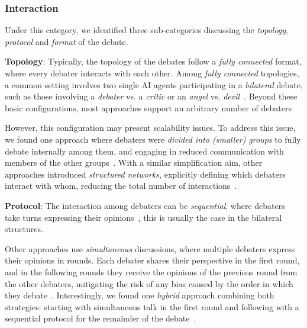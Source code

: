 \documentclass[conference]{IEEEtran}
\begin{document}
\subsubsection{Interaction}
Under this category, we identified three sub-categories discussing the \textit{topology}, \textit{protocol} and \textit{format} of the debate.

\textbf{Topology}: 
Typically, the topology of the debates follow a \textit{fully connected} format, where every debater interacts with each other. Among\textit{ fully connected} topologies, a common setting involves two single AI agents participating in a \textit{bilateral} debate, such as those involving a \textit{debater} vs. a \textit{critic} or an \textit{angel} vs. \textit{devil}~\cite{p02-fang-2025,p04-liang-2024,p09-lim-2024, p26-li-2024}. %
Beyond these basic configurations, most approaches support an arbitrary number of debaters~\cite{p11-Huang-2024,p16-Bai-2024,p17-wang-2025,p20-Jeptoo-2025,p21-wang-2024,p28-chan-2024,s05-wang-2024,s09-yang-2024,s11-Yu-He-2024,s12-xiong-2023,s14-pham-2024,s17-du-2024, s23-chen-2024,s28-xu-2023}

However, this configuration may present scalability issues. To address this issue, we found one approach where debaters were \textit{divided into (smaller) groups} to fully debate internally among them, and engaging in reduced communication with members of the other groups~\cite{s24-wang-2024}.
With a similar simplification aim, other approaches introduced \textit{structured networks}, explicitly defining which debaters interact with whom, reducing the total number of interactions~\cite{p03-li-2024,s18-chen-2025, s29-wang-2024}. 



\textbf{Protocol}: The interaction among debaters can be \textit{sequential}, where debaters take turns expressing their opinions~\cite{p02-fang-2025,p04-liang-2024,p09-lim-2024,p11-Huang-2024, p28-chan-2024,s09-yang-2024,s11-Yu-He-2024, s27-Zhu-2023}, 
this is usually the case in the bilateral structures.

Other approaches use \textit{simultaneous} discussions, where multiple debaters express their opinions in rounds. Each debater shares their perspective in the first round, and in the following rounds they receive the opinions of the previous round from the other debaters, mitigating the risk of any bias caused by the order in which they debate~\cite{p03-li-2024,p11-Huang-2024,p16-Bai-2024,p20-Jeptoo-2025,p21-wang-2024,p26-li-2024,p28-chan-2024,s12-xiong-2023,s14-pham-2024,s17-du-2024,s18-chen-2025,s21-li-2024,s23-chen-2024,s24-wang-2024,s28-xu-2023,s29-wang-2024}. Interestingly, we found one \textit{hybrid} approach combining both strategies: starting with simultaneous talk in the first round and following with a sequential protocol for the remainder of the debate~\cite{s05-wang-2024}.
\end{document}
